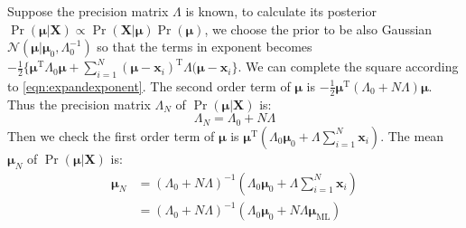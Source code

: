 Suppose the precision matrix $\Lambda$ is known, to 
calculate its posterior $\Pr(\boldsymbol{\mu}\vert\mathbf{X})\varpropto\Pr(\mathbf{X}\vert\boldsymbol{\mu})\Pr(\boldsymbol{\mu})$, we choose the prior to be also Gaussian $\mathcal{N}(\boldsymbol{\mu}\vert\boldsymbol{\mu}_{0},\Lambda_{0}^{-1})$ so that 
the terms in exponent becomes $-\frac{1}{2}\{\boldsymbol{\mu}^{\mathrm{T}}\Lambda_{0}\boldsymbol{\mu}+\sum_{i=1}^{N}(\boldsymbol{\mu}-\mathbf{x}_{i})^{\mathrm{T}}\Lambda{}(\boldsymbol{\mu}-\mathbf{x}_{i}\}$.
We can complete the square according to \eqref{eqn:expandexponent}.  The second order term of $\boldsymbol{\mu}$ is $-\frac{1}{2}\boldsymbol{\mu}^{\mathrm{T}}(\Lambda_{0}+N\Lambda)\boldsymbol{\mu}$. Thus the precision matrix $\Lambda_{N}$ of $\Pr(\boldsymbol{\mu}\vert\mathbf{X})$ is:
\begin{equation}
\Lambda_{N}=\Lambda_{0}+N\Lambda
\end{equation}
Then we check the first order term of $\boldsymbol{\mu}$ is $\boldsymbol{\mu}^{\mathrm{T}}(\Lambda_{0}\boldsymbol{\mu}_{0}+\Lambda{}\sum_{i=1}^{N}\mathbf{x}_{i})$. 
The mean $\boldsymbol{\mu}_{N}$ of $\Pr(\boldsymbol{\mu}\vert\mathbf{X})$ is:
\begin{equation}
\begin{split}
\boldsymbol{\mu}_{N}&=(\Lambda_{0}+N\Lambda)^{-1}(\Lambda_{0}\boldsymbol{\mu}_{0}+\Lambda{}\sum_{i=1}^{N}\mathbf{x}_{i})\\
&=(\Lambda_{0}+N\Lambda)^{-1}(\Lambda_{0}\boldsymbol{\mu}_{0}+N\Lambda{}\boldsymbol{\mu}_{\text{ML}})
\end{split}
\end{equation}


